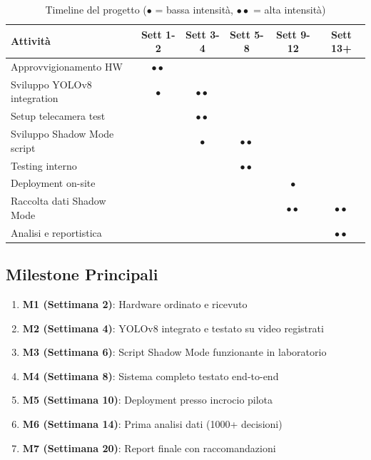 \documentclass[a4paper,11pt]{article}
\begin{document}
\begin{table}[H]
    \centering
    \begin{tabular}{lccccc}
        \toprule
        \textbf{Attività} & \textbf{Sett 1-2} & \textbf{Sett 3-4} & \textbf{Sett 5-8} & \textbf{Sett 9-12} & \textbf{Sett 13+} \\
        \midrule
        Approvvigionamento HW & $\bullet\bullet$ & & & & \\
        Sviluppo YOLOv8 integration & $\bullet$ & $\bullet\bullet$ & & & \\
        Setup telecamera test & & $\bullet\bullet$ & & & \\
        Sviluppo Shadow Mode script & & $\bullet$ & $\bullet\bullet$ & & \\
        Testing interno & & & $\bullet\bullet$ & & \\
        Deployment on-site & & & & $\bullet$ & \\
        Raccolta dati Shadow Mode & & & & $\bullet\bullet$ & $\bullet\bullet$ \\
        Analisi e reportistica & & & & & $\bullet\bullet$ \\
        \bottomrule
    \end{tabular}
    \caption{Timeline del progetto ($\bullet$ = bassa intensità, $\bullet\bullet$ = alta intensità)}
\end{table}

\subsection{Milestone Principali}

\begin{enumerate}
    \item \textbf{M1 (Settimana 2)}: Hardware ordinato e ricevuto
    \item \textbf{M2 (Settimana 4)}: YOLOv8 integrato e testato su video registrati
    \item \textbf{M3 (Settimana 6)}: Script Shadow Mode funzionante in laboratorio
    \item \textbf{M4 (Settimana 8)}: Sistema completo testato end-to-end
    \item \textbf{M5 (Settimana 10)}: Deployment presso incrocio pilota
    \item \textbf{M6 (Settimana 14)}: Prima analisi dati (1000+ decisioni)
    \item \textbf{M7 (Settimana 20)}: Report finale con raccomandazioni
\end{enumerate}
\end{document}
